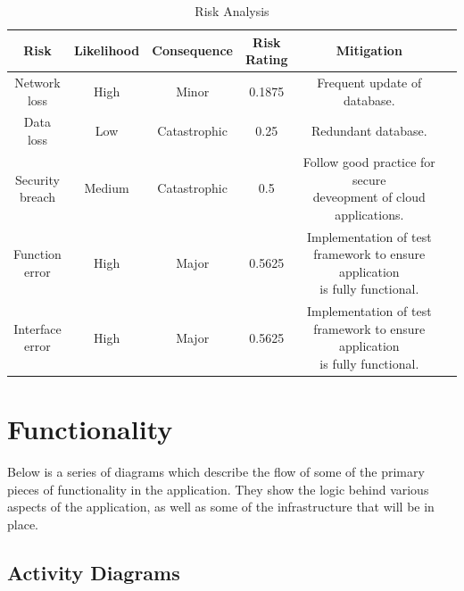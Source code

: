     \begin{table}[h]
        \centering
        \begin{tabular}{|c|c|c|c|c|c|}
            \hline
            Risk & Likelihood & Consequence & \makecell{Risk\\Rating} & Mitigation\\
            \hline
            \hline
            \makecell{Network\\loss} & High & Minor & \cellcolor{green}0.1875 & Frequent update of database.\\
            \hline
            \makecell{Data\\loss} & Low & Catastrophic & \cellcolor{yellow}0.25 & Redundant database.\\
            \hline
            \makecell{Security\\breach} & Medium & Catastrophic & \cellcolor{yellow}0.5 & \makecell{Follow good practice for secure\\deveopment of cloud applications.}\\
            \hline
            \makecell{Function\\error} & High & Major & \cellcolor{red}0.5625 & \makecell{Implementation of test\\framework to ensure application\\is fully functional.}\\
            \hline
            \makecell{Interface\\error} & High & Major & \cellcolor{red}0.5625 & \makecell{Implementation of test\\framework to ensure application\\is fully functional.}\\
            \hline
        \end{tabular}
        \caption{Risk Analysis}
    \end{table}

\section{Functionality}
    Below is a series of diagrams which describe the flow of some of the primary pieces of functionality in the application. They show the logic behind various aspects of the application, as well as some of the infrastructure that will be in place.

    \pagebreak

    \subsection{Activity Diagrams}
    

